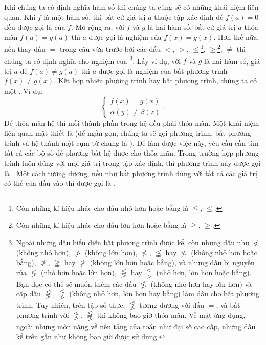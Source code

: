 Khi chúng ta có định nghĩa hàm số thì chúng ta cũng sẽ có những khái niệm liên quan. Khi $f$ là một hàm số, thì bất cứ giá trị $a$ thuộc tập xác định để $f(a) = 0$ đều được gọi là  của $f$. Mở rộng ra, với $f$ và $g$ là hai hàm số, bất cứ giá trị $a$ thỏa mãn $f(a) = g(a)$ thì $a$ được gọi là nghiệm của  $f(x) = g(x)$. Hơn thế nữa, nếu thay dấu $=$ trong câu vừa trước bởi các dấu $<$, $>$, $\leq$\footnote{Còn những kí hiệu khác cho dấu nhỏ hơn hoặc bằng là $\leqq$, $\leqslant$.}, $\geq$\footnote{Còn những kí hiệu khác cho dấu lơn hơn hoặc bằng là $\geqq$, $\geqslant$.}, $\neq$ thì chúng ta có định nghĩa cho nghiệm của \footnote{Ngoài những dấu biểu diễn bất phương trình được kể, còn những dấu như $\nless$ (không nhỏ hơn), $\ngtr$ (không lớn hơn), $\nleq$, $\not \leqq$ hay $\nleqslant$ (không nhỏ hơn hoặc bằng), $\ngeq$, $\not \geqq$ hay $\ngeqslant$ (không lớn hơn hoặc bằng), và những dấu bị nguyền rủa $\lessgtr$ (nhỏ hơn hoặc lớn hơn), $\lesseqgtr$ hay $\lesseqqgtr$ (nhỏ hơn, lớn hơn hoặc bằng). Bạn đọc có thể sẽ muốn thêm các dấu $\not \lessgtr$ (không nhỏ hơn hay lớn hơn) và cặp dấu $\not \lesseqgtr$, $\not \lesseqqgtr$ (không nhỏ hơn, lớn hơn hay bằng) làm dấu cho bất phương trình. Tuy nhiên, trên tập số thực, $\not \lesseqgtr$ tương đương với dấu $=$, và bất phương trình với $\not \lesseqgtr$, $\not \lesseqqgtr$ thì không bao giờ thỏa mãn. Về mặt ứng dụng, ngoài những môn nặng về nền tảng của toán như đại số cao cấp, những dấu kể trên gần như không bao giờ được sử dụng.}. Lấy ví dụ, với $f$ và $g$ là hai hàm số, giá trị $a$ để $f(a) \neq g(a)$ thì $a$ được gọi là nghiệm của bất phương trình $f(x) \neq g(x)$. Kết hợp nhiều phương trình hay bất phương trình, chúng ta có một . Ví dụ:
$$
\begin{cases}
   f(x) = g(x) \\
   \alpha(y) \neq \beta(z)
\end{cases}.
$$
Để thỏa mãn hệ thì mỗi thành phần trong hệ đều phải thỏa mãn. Một khái niệm liên quan mật thiết là  (để ngắn gọn, chúng ta sẽ gọi phương trình, bất phương trình và hệ thành một cụm từ chung là ). Để làm được việc này, yêu cầu cần tìm tất cả các bộ số đẻ phương bất hệ được cho thỏa mãn. Trong trường hợp phương trình luôn đúng với mọi giá trị trong tập xác định, thì phương trình này được gọi là . Một cách tương đương, nếu như bất phương trình đúng với tất cả các giá trị có thể của đầu vào thì được gọi là .


